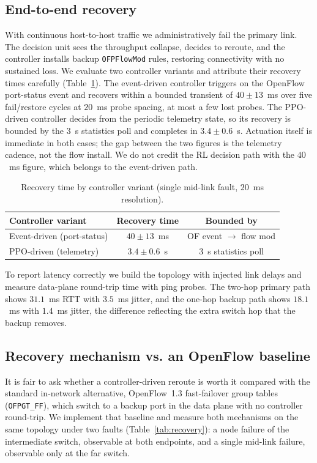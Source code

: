 \documentclass[conference]{IEEEtran}
\begin{document}
\subsection{End-to-end recovery}
\label{sec:e2e}
With continuous host-to-host traffic we administratively fail the primary link. The
decision unit sees the throughput collapse, decides to reroute, and the controller
installs backup \texttt{OFPFlowMod} rules, restoring connectivity with no sustained
loss.
We evaluate two controller variants and attribute their recovery times carefully
(Table~\ref{tab:variants}). The event-driven controller triggers on the OpenFlow
port-status event and recovers within a bounded transient of $40\pm13$~ms over five
fail/restore cycles at $20$~ms probe spacing, at most a few lost probes.
The PPO-driven controller decides from the periodic telemetry state, so its recovery
is bounded by the $3$~s statistics poll and completes in $3.4\pm0.6$~s.
Actuation itself is immediate in both cases; the gap between the two figures is the
telemetry cadence, not the flow install. We do not credit the RL decision path with
the $40$~ms figure, which belongs to the event-driven path.

\begin{table}[t]
\caption{Recovery time by controller variant (single mid-link fault, $20$~ms resolution).}
\label{tab:variants}
\centering
\begin{tabular}{lcc}
\toprule
Controller variant & Recovery time & Bounded by \\
\midrule
Event-driven (port-status)   & $40\pm13$~ms  & OF event $\rightarrow$ flow mod \\
PPO-driven (telemetry)       & $3.4\pm0.6$~s & 3~s statistics poll \\
\bottomrule
\end{tabular}
\end{table}

To report latency correctly we build the topology with injected link delays and
measure data-plane round-trip time with ping probes. The two-hop primary path shows
$31.1$~ms RTT with $3.5$~ms jitter, and the one-hop backup path shows $18.1$~ms with
$1.4$~ms jitter, the difference reflecting the extra switch hop that the backup
removes.

\subsection{Recovery mechanism vs. an OpenFlow baseline}
\label{sec:recovery-baseline}
It is fair to ask whether a controller-driven reroute is worth it compared with the
standard in-network alternative, OpenFlow~1.3 fast-failover group tables
(\texttt{OFPGT\_FF}), which switch to a backup port in the data plane with no
controller round-trip. We implement that baseline and measure both mechanisms on the
same topology under two faults (Table~\ref{tab:recovery}): a node failure of the
intermediate switch, observable at both endpoints, and a single mid-link failure,
observable only at the far switch.
\end{document}
